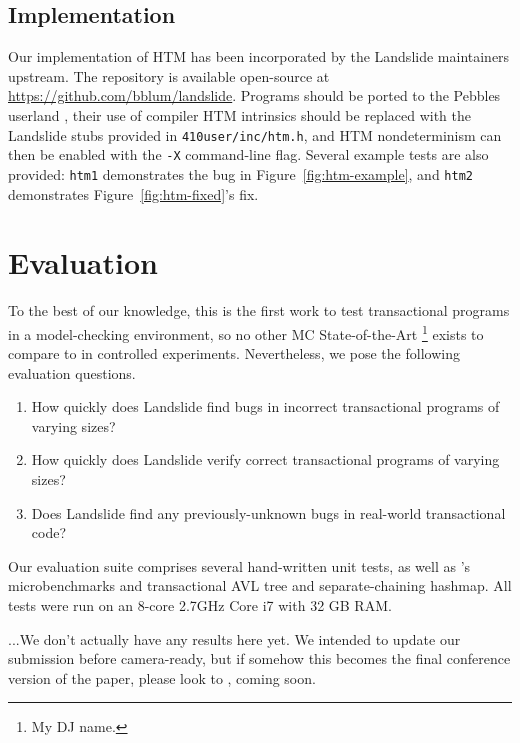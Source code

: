 \documentclass[10pt]{sigplanconf}
\begin{document}
\subsection{Implementation}

Our implementation of HTM has been incorporated by the Landslide maintainers upstream.
The repository is available open-source at \url{https://github.com/bblum/landslide}.
Programs should be ported to the Pebbles userland \cite{thrlib,kspec},
their use of compiler HTM intrinsics should be replaced with the Landslide stubs provided in {\tt 410user/inc/htm.h},
and HTM nondeterminism can then be enabled with the {\tt -X} command-line flag.
Several example tests are also provided:
{\tt htm1} demonstrates the bug in Figure~\ref{fig:htm-example},
and {\tt htm2} demonstrates Figure~\ref{fig:htm-fixed}'s fix.


\section{Evaluation}

To the best of our knowledge, this is the first work to test transactional programs in a model-checking environment,
so no other MC State-of-the-Art%
\footnote{My DJ name.}
exists to compare to in controlled experiments.
Nevertheless, we pose the following evaluation questions.

\begin{enumerate}
	\item How quickly does Landslide find bugs in incorrect transactional programs of varying sizes?
	\item How quickly does Landslide verify correct transactional programs of varying sizes?
	\item Does Landslide find any previously-unknown bugs in real-world transactional code?
\end{enumerate}

Our evaluation suite comprises several hand-written unit tests,
as well as \cite{htm-mario}'s microbenchmarks and transactional AVL tree and separate-chaining hashmap.
All tests were run on an 8-core 2.7GHz Core i7 with 32 GB RAM.

...We don't actually have any results here yet.
We intended to update our submission before camera-ready,
but if somehow this becomes the final conference version of the paper,
please look to \cite{landslide-phdthesis}, coming soon.
\end{document}
